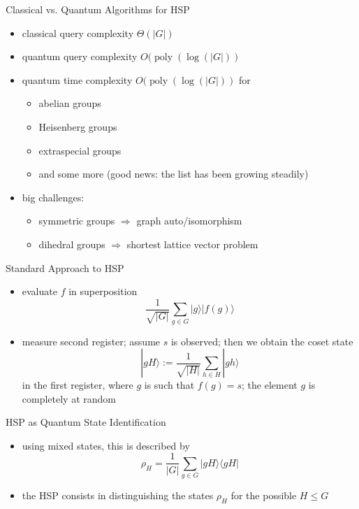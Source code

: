 \documentclass[slideColor]{prosper}
\newcommand{\poly}{\mathop{\mathrm{poly}}}
\renewcommand{\>}{\rangle}
\newcommand{\<}{\langle}
\begin{document}

\begin{slide}{Classical vs. Quantum Algorithms for HSP}
\begin{itemize}
\item classical query complexity $\Theta(|G|)$
\item quantum query complexity $O(\poly(\log(|G|))$
\item quantum time complexity $O(\poly(\log(|G|))$ for
\begin{itemize}
\item abelian groups
\item Heisenberg groups
\item extraspecial groups
\item and some more (good news: the list has been growing steadily)
\end{itemize}
\item big challenges:
\begin{itemize}
\item symmetric groups $\Longrightarrow$ graph auto/isomorphism
\item dihedral groups $\Longrightarrow$ shortest lattice vector problem 
\end{itemize}
\end{itemize}
\end{slide}


\begin{slide}{Standard Approach to HSP}
\begin{itemize}
\item evaluate $f$ in superposition
\[
\frac{1}{\sqrt{|G|}} \sum_{g\in G}|g\>|f(g)\>
\]
\item measure second register; assume $s$ is observed; then we obtain the coset state
\[
|gH\>:=\frac{1}{\sqrt{|H|}} \sum_{h\in H}|gh\>
\]
in the first register, where $g$ is such that $f(g)=s$; the element $g$ is completely at random
\end{itemize}
\end{slide}


\begin{slide}{HSP as Quantum State Identification}
\begin{itemize}
\item using mixed states, this is described by
\[
\rho_H = \frac{1}{|G|}\sum_{g\in G}|gH\>\<gH| 
\]
\item the HSP consists in distinguishing the states $\rho_H$ for the possible $H\le G$
\end{itemize}
\end{slide}
\end{document}
